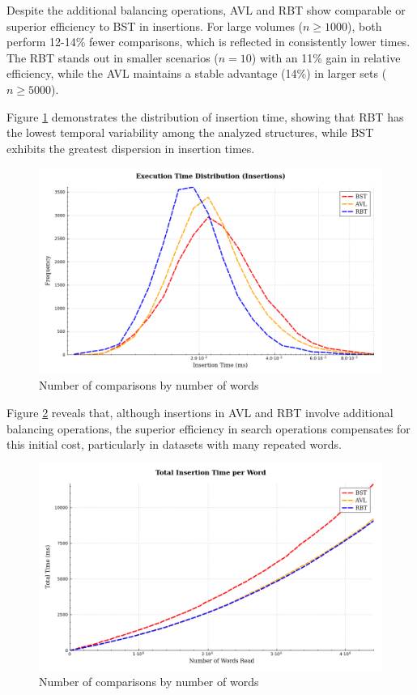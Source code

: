 Despite the additional balancing operations, AVL and RBT show comparable
or superior efficiency to BST in insertions. For large volumes ($n \geq 1000$), both perform 12-14\% fewer
comparisons, which is reflected in consistently lower times. The RBT stands out in smaller scenarios
($n = 10$) with an 11\% gain in relative efficiency, while the AVL maintains a stable advantage
(14\%) in larger sets ($n \geq 5000$).

Figure \ref{fig:timedist} demonstrates the distribution of insertion time,
showing that RBT has the lowest temporal variability among the analyzed structures,
while BST exhibits the greatest dispersion in insertion times.

\begin{figure}[H]
    \centering
    \includegraphics[width=0.8\linewidth]{img/Graph_5_10103.pdf}
    \caption{Number of comparisons by number of words}
    \label{fig:timedist}
\end{figure}

Figure \ref{fig:cumulativedist} reveals that, although insertions in AVL and RBT
involve additional balancing operations, the superior efficiency in search operations
compensates for this initial cost, particularly in datasets with many repeated words.

\begin{figure}[H]
    \centering
    \includegraphics[width=0.8\linewidth]{img/Graph_4_10103.pdf}
    \caption{Number of comparisons by number of words}
    \label{fig:cumulativedist}
\end{figure}

